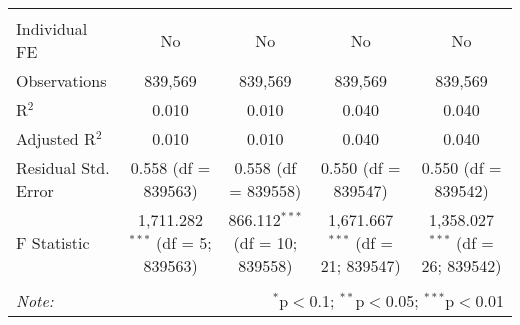 \documentclass[
]{article}
\begin{document}
\begin{table}[!htbp]
{\begin{tabular}{@{\extracolsep{5pt}}lcccc}
\hline \\[-1.8ex] 
Individual FE & No & No & No & No \\ 
Observations & 839,569 & 839,569 & 839,569 & 839,569 \\ 
R$^{2}$ & 0.010 & 0.010 & 0.040 & 0.040 \\ 
Adjusted R$^{2}$ & 0.010 & 0.010 & 0.040 & 0.040 \\ 
Residual Std. Error & 0.558 (df = 839563) & 0.558 (df = 839558) & 0.550 (df = 839547) & 0.550 (df = 839542) \\ 
F Statistic & 1,711.282$^{***}$ (df = 5; 839563) & 866.112$^{***}$ (df = 10; 839558) & 1,671.667$^{***}$ (df = 21; 839547) & 1,358.027$^{***}$ (df = 26; 839542) \\ 
\hline 
\hline \\[-1.8ex] 
\textit{Note:}  & \multicolumn{4}{r}{$^{*}$p$<$0.1; $^{**}$p$<$0.05; $^{***}$p$<$0.01} \\ 
\end{tabular}
} 
\end{table} 
\newpage
\end{document}
